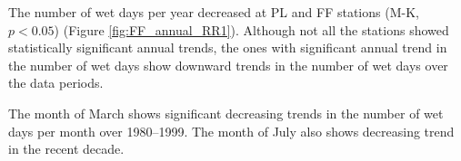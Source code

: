 The number of wet days per year decreased at PL and FF stations (M-K, $p<0.05$)
(Figure \ref{fig:FF_annual_RR1}). Although not all the stations showed
statistically significant annual trends, the ones with significant annual trend
in the number of wet days show downward trends in the number of wet days over
the data periods.

The month of March shows significant decreasing trends in the number of wet days
per month over 1980--1999. The month of July also shows decreasing trend in the
recent decade.

\begin{figure}[htbp]
  \centering


\end{figure}
